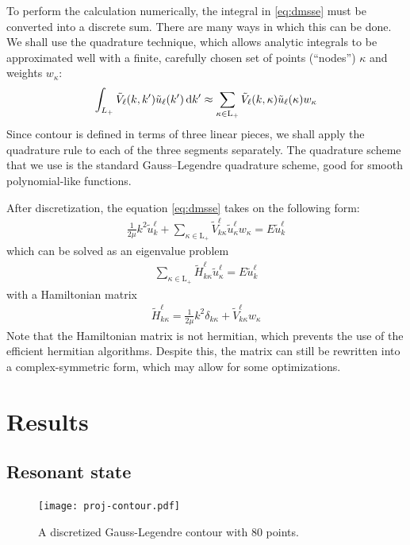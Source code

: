 \documentclass[amsmath, amssymb, aps, floatfix, nofootinbib, preprintnumbers,
  showpacs, superscriptaddress, twocolumn]{revtex4-1}
\begin{document}
To perform the calculation numerically, the integral in \eqref{eq:dmsse} must
be converted into a discrete sum.  There are many ways in which this can be
done.  We shall use the quadrature technique, which allows analytic integrals
to be approximated well with a finite, carefully chosen set of points
(``nodes'') $\kappa$ and weights $w_\kappa$:
\begin{align*}
  \int_{L_+} \tilde V_\ell(k, k') \tilde u_\ell(k') \operatorname{d \!}\mathord{} k'
  \approx \sum_{\kappa \in \mathrm L_+}
  \tilde V_\ell(k, \kappa) \tilde u_\ell(\kappa) w_\kappa
\end{align*}
Since contour is defined in terms of three linear pieces, we shall apply the
quadrature rule to each of the three segments separately.  The quadrature
scheme that we use is the standard Gauss--Legendre quadrature scheme, good for
smooth polynomial-like functions.

After discretization, the equation \eqref{eq:dmsse} takes on the following
form:
\begin{align*}
  \frac{1}{2 \mu} k^2 \tilde u^\ell_k
  + \sum_{\kappa \in \mathrm L_+}
  \tilde V^\ell_{k\kappa} \tilde u^\ell_\kappa w_\kappa
  = E \tilde u^\ell_k
\end{align*}
which can be solved as an eigenvalue problem
\begin{align*}
  \sum_{\kappa \in \mathrm L_+} \tilde H^\ell_{k \kappa} \tilde u^\ell_\kappa
  = E \tilde u^\ell_k
\end{align*}
with a Hamiltonian matrix
\begin{align*}
  \tilde H^\ell_{k \kappa} =
  \frac{1}{2 \mu} k^2 \delta_{k\kappa} + \tilde V^\ell_{k\kappa} w_\kappa
\end{align*}
Note that the Hamiltonian matrix is not hermitian, which prevents the use of
the efficient hermitian algorithms.  Despite this, the matrix can still be
rewritten into a complex-symmetric form, which may allow for some
optimizations.\cite{BarOn1998}

\section{Results}

\subsection{Resonant state}

\begin{figure}
  \texttt{[image: proj-contour.pdf]}
  \caption{A discretized Gauss-Legendre contour with 80 points.}
  \label{fig:contour}
\end{figure}
\end{document}
